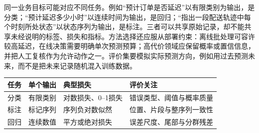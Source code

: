 同一业务目标可能对应不同任务。例如“预计订单是否延迟”以有限类别为输出，是分类；“预计延迟多少小时”以连续时间为输出，是回归；“指出一段配送轨迹中每个时刻所处状态”以状态序列为输出，是标注。三者可以共享原始记录，却不能共享未经说明的标签、损失和指标。方法选择还应服从部署约束：离线批处理可容许较高延迟，在线决策需要明确单次预测预算；高代价领域应保留概率或置信信息，并把人工复核作为允许动作之一。评价集要模拟实际预测方向，例如用过去预测未来，而不是把未来记录随机混入训练数据。

\begin{center}
\begin{tabularx}{\linewidth}{@{}l l l X@{}}
\toprule
任务 & 单个输出 & 典型损失 & 评价关注\\ \midrule
分类 & 有限类别 & 对数损失、0--1损失 & 错误类型、阈值与概率质量\\
标注 & 标记序列 & 序列负对数似然 & 位置、片段与整序列一致性\\
回归 & 连续数值 & 平方或绝对损失 & 误差尺度、尾部与分群残差\\
\bottomrule
\end{tabularx}
\end{center}

